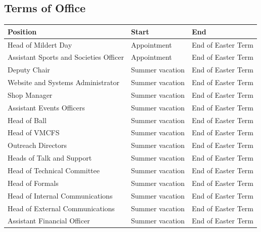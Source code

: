 \documentclass[12pt]{article}
\begin{document}
    \subsection{Terms of Office}
    \begin{longtable}{|l|l|l|}
        \hline
        \textbf{Position} & \textbf{Start} & \textbf{End}\\
        \hline\hline
        \endhead
        \hline
        \endfoot

        Head of Mildert Day & Appointment & End of Easter Term\\
        Assistant Sports and Societies Officer & Appointment & End of Easter Term\\
        Deputy Chair & Summer vacation & End of Easter Term\\
        Website and Systems Administrator & Summer vacation & End of Easter Term\\
        Shop Manager & Summer vacation & End of Easter Term\\
        Assistant Events Officers & Summer vacation & End of Easter Term\\
        Head of Ball & Summer vacation & End of Easter Term\\
        Head of VMCFS & Summer vacation & End of Easter Term\\
        Outreach Directors & Summer vacation & End of Easter Term\\
        Heads of Talk and Support & Summer vacation & End of Easter Term\\
        Head of Technical Committee & Summer vacation & End of Easter Term\\
        Head of Formals & Summer vacation & End of Easter Term\\
        Head of Internal Communications & Summer vacation & End of Easter Term\\
        Head of External Communications & Summer vacation & End of Easter Term\\
        Assistant Financial Officer & Summer vacation & End of Easter Term\\
    \end{longtable}
\end{document}
